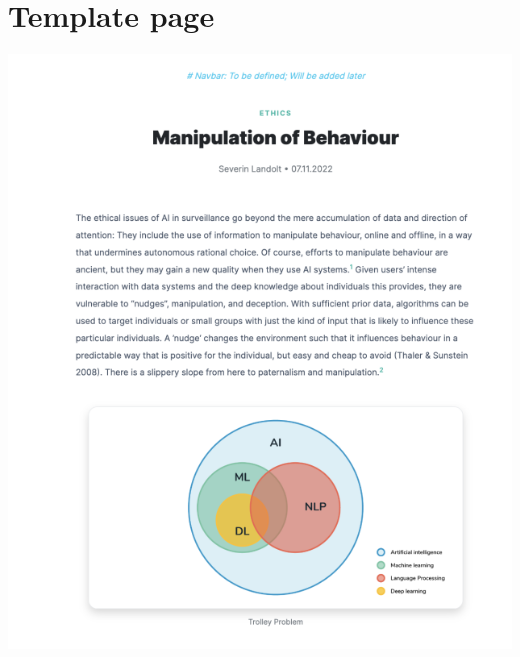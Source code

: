 \documentclass[12pt]{article}
\begin{document}
\section{Template page}
\includegraphics[width=\linewidth]{templatepage.png}
\end{document}

